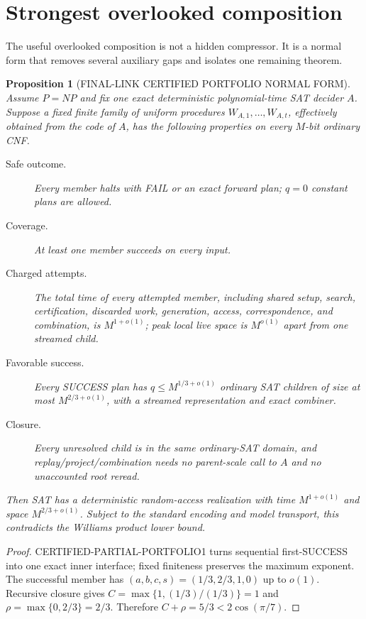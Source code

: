 \documentclass[10pt]{article}
\newtheorem{proposition}{Proposition}
\begin{document}
\section{Strongest overlooked composition}

The useful overlooked composition is not a hidden compressor.  It is a normal
form that removes several auxiliary gaps and isolates one remaining theorem.

\begin{proposition}[FINAL-LINK CERTIFIED PORTFOLIO NORMAL FORM]
Assume $P=NP$ and fix one exact deterministic polynomial-time SAT decider
$A$.  Suppose a fixed finite family of uniform procedures
$W_{A,1},\ldots,W_{A,t}$, effectively obtained from the code of $A$, has the
following properties on every $M$-bit ordinary CNF.
\begin{description}
\item[Safe outcome.] Every member halts with FAIL or an exact forward plan;
$q=0$ constant plans are allowed.
\item[Coverage.] At least one member succeeds on every input.
\item[Charged attempts.] The total time of every attempted member, including
shared setup, search, certification, discarded work, generation, access,
correspondence, and combination, is $M^{1+o(1)}$; peak local live space is
$M^{o(1)}$ apart from one streamed child.
\item[Favorable success.] Every SUCCESS plan has
$q\le M^{1/3+o(1)}$ ordinary SAT children of size at most
$M^{2/3+o(1)}$, with a streamed representation and exact combiner.
\item[Closure.] Every unresolved child is in the same ordinary-SAT domain,
and replay/project/combination needs no parent-scale call to $A$ and no
unaccounted root reread.
\end{description}
Then SAT has a deterministic random-access realization with time
$M^{1+o(1)}$ and space $M^{2/3+o(1)}$.  Subject to the standard encoding and
model transport, this contradicts the Williams product lower bound.
\end{proposition}

\begin{proof}
CERTIFIED-PARTIAL-PORTFOLIO1 turns sequential first-SUCCESS into one exact
inner interface; fixed finiteness preserves the maximum exponent.  The
successful member has $(a,b,c,s)=(1/3,2/3,1,0)$ up to $o(1)$.  Recursive
closure gives $C=\max\{1,(1/3)/(1/3)\}=1$ and
$\rho=\max\{0,2/3\}=2/3$.  Therefore $C+\rho=5/3<2\cos(\pi/7)$.
\end{proof}
\end{document}
